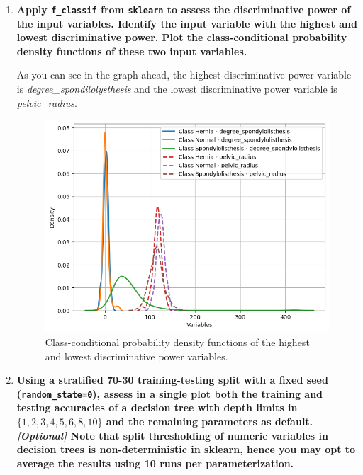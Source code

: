 \documentclass[12pt]{article}
\begin{document}
\begin{enumerate}[leftmargin=\labelsep]
  \item \textbf{Apply \texttt{f\_classif} from \texttt{sklearn} to assess the discriminative power of the input variables.
          Identify the input variable with the highest and lowest discriminative power.
          Plot the class-conditional probability density functions of these two input variables.}

        \vskip 0.3cm
        

        As you can see in the graph ahead, the highest discriminative power variable is \textit{degree\_spondilolysthesis} and
        the lowest discriminative power variable is \textit{pelvic\_radius}.

        \begin{figure}[H]
          \centering
          \includegraphics[width=12cm]{./assets/class_conditional_probability.png}
          \caption{Class-conditional probability density functions of the highest and lowest discriminative power variables.}
          \label{fig:PartII-ex1-plot}
        \end{figure}

  \item \textbf{Using a stratified 70-30 training-testing split with a fixed seed (\texttt{random\_state=0}), assess in a
          single plot both the training and testing accuracies of a decision tree with depth limits in
          $\{1,2,3,4,5,6,8,10\}$ and the remaining parameters as default.\vskip 0.05cm
          \textit{[Optional]} Note that split thresholding of numeric variables in decision trees is non-deterministic
          in sklearn, hence you may opt to average the results using 10 runs per parameterization.}


\end{enumerate}
\end{document}
